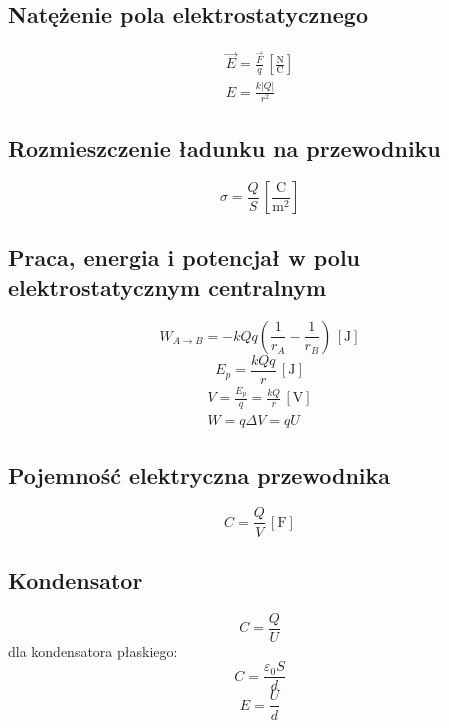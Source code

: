 \documentclass{article}
\numberwithin{equation}{section}
\newcommand{\unit}[1]{\, \left[\mathrm{#1}\right]}
\begin{document}
    \subsection{Natężenie pola elektrostatycznego}
      \begin{gather}
        \vec E = \frac{\vec F}{q} \unit{\frac{N}{C}}\\
        E = \frac{k|Q|}{r^2}
      \end{gather}
    \subsection{Rozmieszczenie ładunku na przewodniku}
      \begin{equation}
        \sigma = \frac{Q}{S} \unit{\frac{C}{m^2}}
      \end{equation}
    \subsection{Praca, energia i potencjał w polu elektrostatycznym centralnym}
      \begin{equation}
        W_{A\rightarrow B} = -kQq\left(\frac{1}{r_A} - \frac{1}{r_B}\right) \unit{J}
      \end{equation}
      \begin{equation}
        E_p = \frac{kQq}{r} \unit{J}
      \end{equation}
      \begin{gather}
        V = \frac{E_p}{q} = \frac{kQ}{r} \unit{V}\\
        W = q\Delta V = qU
      \end{gather}
    \subsection{Pojemność elektryczna przewodnika}
      \begin{equation}
        C = \frac{Q}{V} \unit{F}
      \end{equation}
    \subsection{Kondensator}
      \begin{equation}
        C= \frac{Q}{U}
      \end{equation}
      dla kondensatora płaskiego:
      \begin{equation}
        C= \frac{\varepsilon_0S}{d}
      \end{equation}
      \begin{equation}
        E = \frac{U}{d}
      \end{equation}
\end{document}
